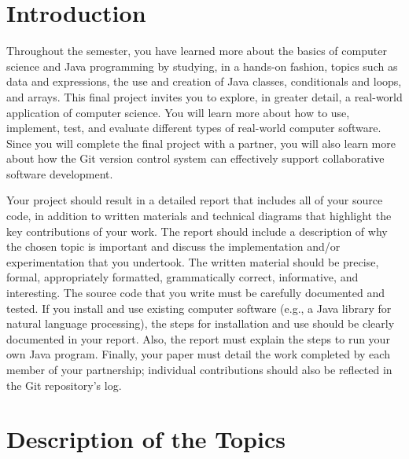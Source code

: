 


\usepackage[compact]{titlesec}


\vspace*{-.2in}

\section*{Introduction}

Throughout the semester, you have learned more about the basics of computer science and Java programming by studying, in
a hands-on fashion, topics such as data and expressions, the use and creation of Java classes, conditionals and loops,
and arrays.  This final project invites you to explore, in greater detail, a real-world application of computer science.
You will learn more about how to use, implement, test, and evaluate different types of real-world computer software.
Since you will complete the final project with a partner, you will also learn more about how the Git version control
system can effectively support collaborative software development.

Your project should result in a detailed report that includes all of your source code, in addition to written materials
and technical diagrams that highlight the key contributions of your work.  The report should include a description of
why the chosen topic is important and discuss the implementation and/or experimentation that you undertook.  The written
material should be precise, formal, appropriately formatted, grammatically correct, informative, and interesting.  The
source code that you write must be carefully documented and tested.  If you install and use existing computer software
(e.g., a Java library for natural language processing),  the steps for installation and use should be clearly documented
in your report. Also, the report must explain the steps to run your own Java program.  Finally, your paper must detail
the work completed by each member of your partnership; individual contributions should also be reflected in the Git
repository's log.

\section*{Description of the Topics}

